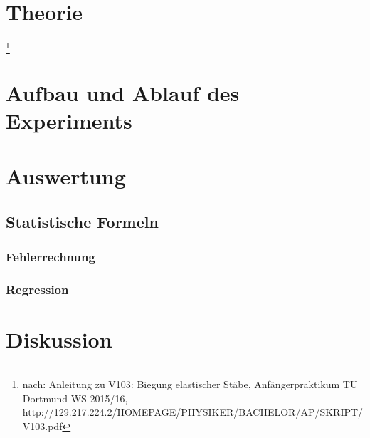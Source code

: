 \documentclass[a4,12pt]{article}
\begin{document}



\tableofcontents
\newpage


\section{Theorie}\footnote{nach: Anleitung zu V103: Biegung elastischer Stäbe, Anfängerpraktikum TU Dortmund WS 2015/16, http://129.217.224.2/HOMEPAGE/PHYSIKER/BACHELOR/AP/SKRIPT/V103.pdf}

\newpage


\section{Aufbau und Ablauf des Experiments}

\newpage


\section{Auswertung}
\subsection{Statistische Formeln}
\subsubsection{Fehlerrechnung}
\label{sec:Fehlerrechnung}

\subsubsection{Regression}
\label{sec:regression}


\newpage


\section{Diskussion}

\end{document}
